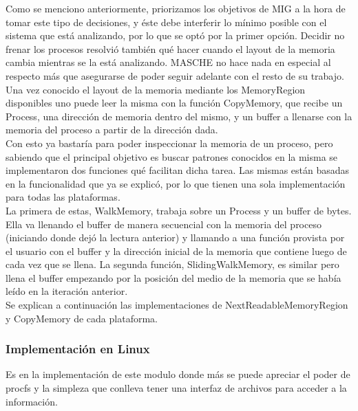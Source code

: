 \noindent Como se menciono anteriormente, priorizamos los objetivos de MIG a la
hora de tomar este tipo de decisiones, y éste debe interferir lo mínimo posible
con el sistema que está analizando, por lo que se optó por la primer opción.
Decidir no frenar los procesos resolvió también qué hacer cuando el layout de
la memoria cambia mientras se la está analizando. MASCHE no hace nada en
especial al respecto más que asegurarse de poder seguir adelante con el resto
de su trabajo.\\

Una vez conocido el layout de la memoria mediante los MemoryRegion disponibles
uno puede leer la misma con la función CopyMemory, que recibe un Process, una
dirección de memoria dentro del mismo, y un buffer a llenarse con la memoria
del proceso a partir de la dirección dada.\\

Con esto ya bastaría para poder inspeccionar la memoria de un proceso, pero
sabiendo que el principal objetivo es buscar patrones conocidos en la misma
se implementaron dos funciones qué facilitan dicha tarea. Las mismas están
basadas en la funcionalidad que ya se explicó, por lo que tienen una sola
implementación para todas las plataformas.\\

La primera de estas, WalkMemory, trabaja sobre un Process y un buffer de bytes.
Ella va llenando el buffer de manera secuencial con la memoria del proceso
(iniciando donde dejó la lectura anterior) y llamando a una función provista
por el usuario con el buffer y la dirección inicial de la memoria que contiene
luego de cada vez que se llena. La segunda función, SlidingWalkMemory, es
similar pero llena el buffer empezando por la posición del medio de la memoria
que se había leído en la iteración anterior.\\

Se explican a continuación las implementaciones de NextReadableMemoryRegion y
CopyMemory de cada plataforma.\\

\subsubsection{Implementación en Linux}

Es en la implementación de este modulo donde más se puede apreciar el poder de
procfs y la simpleza que conlleva tener una interfaz de archivos para acceder a
la información.\\

